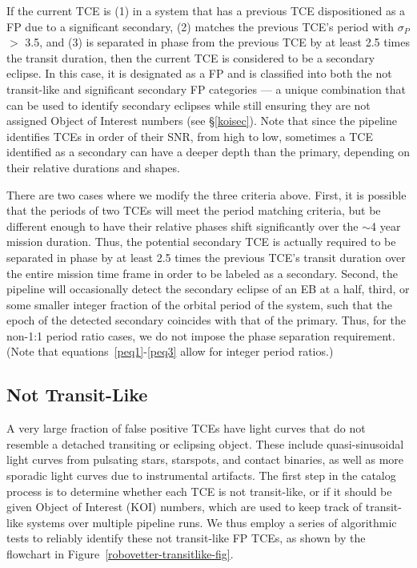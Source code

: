 If the current TCE is (1) in a system that has a previous TCE dispositioned as a FP due to a significant secondary, (2) matches the previous TCE's period with $\sigma_{P}$ $>$ 3.5, and (3) is separated in phase from the previous TCE by at least 2.5 times the transit duration, then the current TCE is considered to be a secondary eclipse. In this case, it is designated as a FP and is classified into both the not transit-like and significant secondary FP categories --- a unique combination that can be used to identify secondary eclipses while still ensuring they are not assigned \kepler{} Object of Interest numbers (see \S\ref{koisec}). Note that since the \kepler{} pipeline identifies TCEs in order of their SNR, from high to low, sometimes a TCE identified as a secondary can have a deeper depth than the primary, depending on their relative durations and shapes.

There are two cases where we modify the three criteria above. First, it is possible that the periods of two TCEs will meet the period matching criteria, but be different enough to have their relative phases shift significantly over the $\sim$4 year mission duration. Thus, the potential secondary TCE is actually required to be separated in phase by at least 2.5 times the previous TCE's transit duration over the entire mission time frame in order to be labeled as a secondary. Second, the \kepler{} pipeline will occasionally detect the secondary eclipse of an EB at a half, third, or some smaller integer fraction of the orbital period of the system, such that the epoch of the detected secondary coincides with that of the primary. Thus, for the non-1:1 period ratio cases, we do not impose the phase separation requirement. (Note that equations~\ref{peq1}-\ref{peq3} allow for integer period ratios.)



\subsection{Not Transit-Like}
\label{nottransitlikesec}

A very large fraction of false positive TCEs have light curves that do not resemble a detached transiting or eclipsing object. These include quasi-sinusoidal light curves from pulsating stars, starspots, and contact binaries, as well as more sporadic light curves due to instrumental artifacts. The first step in the catalog process is to determine whether each TCE is not transit-like, or if it should be given \kepler{} Object of Interest (KOI) numbers, which are used to keep track of transit-like systems over multiple \kepler{} pipeline runs. We thus employ a series of algorithmic tests to reliably identify these not transit-like FP TCEs, as shown by the flowchart in Figure~\ref{robovetter-transitlike-fig}.


